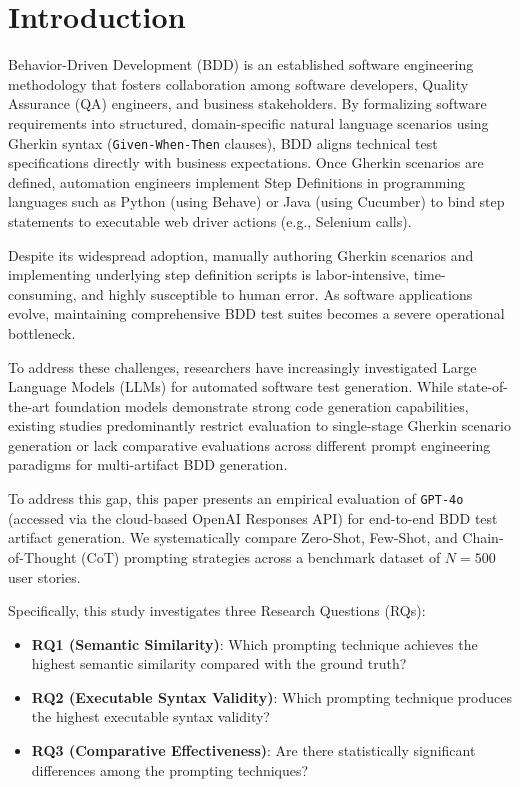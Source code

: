 \section{Introduction}
\label{sec:intro}

Behavior-Driven Development (BDD) is an established software engineering methodology that fosters collaboration among software developers, Quality Assurance (QA) engineers, and business stakeholders. By formalizing software requirements into structured, domain-specific natural language scenarios using Gherkin syntax (\texttt{Given-When-Then} clauses), BDD aligns technical test specifications directly with business expectations. Once Gherkin scenarios are defined, automation engineers implement Step Definitions in programming languages such as Python (using Behave) or Java (using Cucumber) to bind step statements to executable web driver actions (e.g., Selenium calls).

Despite its widespread adoption, manually authoring Gherkin scenarios and implementing underlying step definition scripts is labor-intensive, time-consuming, and highly susceptible to human error. As software applications evolve, maintaining comprehensive BDD test suites becomes a severe operational bottleneck.

To address these challenges, researchers have increasingly investigated Large Language Models (LLMs) for automated software test generation. While state-of-the-art foundation models demonstrate strong code generation capabilities, existing studies predominantly restrict evaluation to single-stage Gherkin scenario generation or lack comparative evaluations across different prompt engineering paradigms for multi-artifact BDD generation.

To address this gap, this paper presents an empirical evaluation of \texttt{GPT-4o} (accessed via the cloud-based OpenAI Responses API) for end-to-end BDD test artifact generation. We systematically compare Zero-Shot, Few-Shot, and Chain-of-Thought (CoT) prompting strategies across a benchmark dataset of $N=500$ user stories.

Specifically, this study investigates three Research Questions (RQs):
\begin{itemize}
    \item \textbf{RQ1 (Semantic Similarity)}: Which prompting technique achieves the highest semantic similarity compared with the ground truth?
    \item \textbf{RQ2 (Executable Syntax Validity)}: Which prompting technique produces the highest executable syntax validity?
    \item \textbf{RQ3 (Comparative Effectiveness)}: Are there statistically significant differences among the prompting techniques?
\end{itemize}

